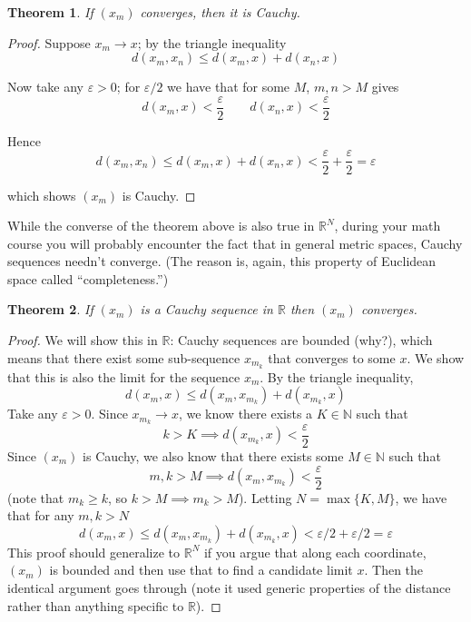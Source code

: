 \documentclass{article}
\newcommand{\R}{\mathbb{R}}
\newcommand{\N}{\mathbb{N}}
\newtheorem{theorem}{Theorem}
\theoremstyle{definition}
\begin{document}
\begin{theorem}
  If $(x_m)$ converges, then it is Cauchy.
\end{theorem}

\begin{proof}
  Suppose $x_m \to x$; by the triangle inequality
  \[
    d(x_m, x_n) \le d(x_m, x) + d(x_n, x)
  \]

  Now take any $\varepsilon > 0$; for $\varepsilon / 2$ we have that for some $M$, $m, n > M$ gives
  \[
    d(x_m, x) < \dfrac{\varepsilon}{2}
    \quad\quad
    d(x_n, x) < \dfrac{\varepsilon}{2}
  \]

  Hence
  \[
    d(x_m, x_n) \le d(x_m, x) + d(x_n, x) < \dfrac{\varepsilon}{2} +  \dfrac{\varepsilon}{2} = \varepsilon
  \]

  which shows $(x_m)$ is Cauchy.
\end{proof}

While the converse of the theorem above is also true in $\mathbb{R}^N$, during your math course you will probably encounter the fact that in general metric spaces, Cauchy sequences needn't converge. (The reason is, again, this property of Euclidean space called ``completeness.'')

\begin{theorem}
  If $(x_m)$ is a Cauchy sequence in $\R$ then $(x_m)$ converges.
\end{theorem}
\begin{proof}
    We will show this in $\R$: Cauchy sequences are bounded (why?), which means that there exist some sub-sequence $x_{m_k}$ that converges to some $x$. We show that this is also the limit for the sequence $x_m$. By the triangle inequality,
  \begin{equation*}
      d(x_m, x) \le d(x_m, x_{m_k}) + d(x_{m_k}, x)
  \end{equation*}
  Take any $\varepsilon > 0$. Since $x_{m_k} \to x$, we know there exists a $K\in \N$ such that
  \begin{equation*}
      k > K \implies d(x_{m_k}, x) < \frac{\varepsilon}{2}
  \end{equation*}
  Since $(x_m)$ is Cauchy, we also know that there exists some $M \in \N$ such that 
  \begin{equation*}
      m,k > M \implies d(x_m, x_{m_k}) < \frac{\varepsilon}{2}
  \end{equation*}
  (note that $m_k \geq k$, so $k > M \implies m_k > M$). Letting $N=\max\{K,M\}$, we have that for any $m,k > N$
  \begin{equation*}
      d(x_m, x) \leq d(x_m, x_{m_k}) + d(x_{m_k}, x) < \varepsilon/2 + \varepsilon/2 = \varepsilon
  \end{equation*}
  This proof should generalize to $\R^N$ if you argue that along each coordinate, $(x_m)$ is bounded and then use that to find a candidate limit $x$. Then the identical argument goes through (note it used generic properties of the distance rather than anything specific to $\R$).
\end{proof}
\end{document}
